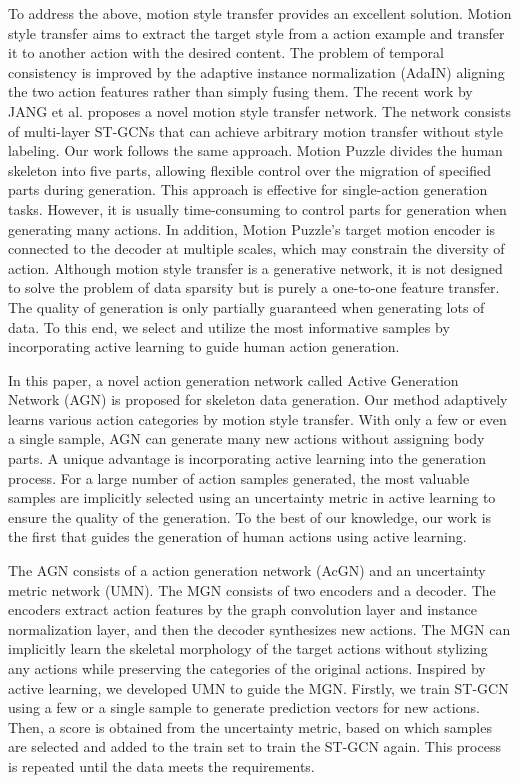 To address the above, motion style transfer provides an excellent solution. Motion style transfer \cite{jang2022motion, aberman2020unpaired, ParkSoomin2021Diverse, 2016A} aims to extract the target style from a action example and transfer it to another action with the desired content. The problem of temporal consistency is improved by the adaptive instance normalization (AdaIN) \cite{huang2017arbitrary,saito2020coco} aligning the two action features rather than simply fusing them.
The recent work by JANG et al. \cite{jang2022motion} proposes a novel motion style transfer network. The network consists of multi-layer ST-GCNs that can achieve arbitrary motion transfer without style labeling. Our work follows the same approach.
Motion Puzzle divides the human skeleton into five parts, allowing flexible control over the migration of specified parts during generation. This approach is effective for single-action generation tasks.
However, it is usually time-consuming to control parts for generation when generating many actions. In addition, Motion Puzzle's target motion encoder is connected to the decoder at multiple scales, which may constrain the diversity of action.
Although motion style transfer is a generative network, it is not designed to solve the problem of data sparsity but is purely a one-to-one feature transfer. The quality of generation is only partially guaranteed when generating lots of data. 
To this end, we select and utilize the most informative samples by incorporating active learning \cite{du2021contrastive, sinha2019variational, zhang2020state} to guide human action generation.

In this paper, a novel action generation network called Active Generation Network (AGN) is proposed for skeleton data generation. Our method adaptively learns various action categories by motion style transfer. With only a few or even a single sample, AGN can generate many new actions without assigning body parts. A unique advantage is incorporating active learning into the generation process. For a large number of action samples generated, the most valuable samples are implicitly selected using an uncertainty metric in active learning to ensure the quality of the generation. To the best of our knowledge, our work is the first that guides the generation of human actions using active learning.

The AGN consists of a action generation network (AcGN) and an uncertainty metric network (UMN). The MGN consists of two encoders and a decoder. The encoders extract action features by the graph convolution layer and instance normalization layer, and then the decoder synthesizes new actions. The MGN can implicitly learn the skeletal morphology of the target actions without stylizing any actions while preserving the categories of the original actions. Inspired by active learning, we developed UMN to guide the MGN. 
Firstly, we train ST-GCN using a few or a single sample to generate prediction vectors for new actions. Then, a score is obtained from the uncertainty metric, based on which samples are selected and added to the train set to train the ST-GCN again. 
This process is repeated until the data meets the requirements. 

